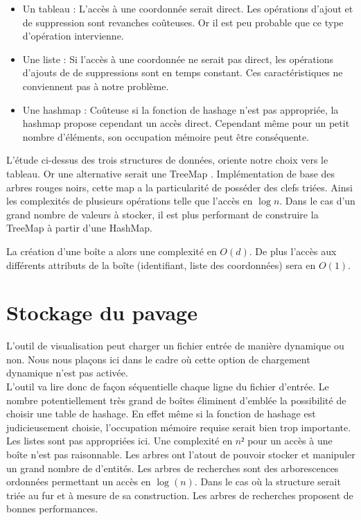 \begin{itemize}
 \item
Un tableau : L'accès à une coordonnée serait direct. Les opérations d'ajout et de suppression sont revanches coûteuses. Or il est peu probable que ce type d'opération intervienne.
\item
Une liste : Si l'accès à une coordonnée ne serait pas direct, les opérations d'ajouts de de suppressions sont en temps constant. Ces caractéristiques ne conviennent pas à notre problème.
\item
Une hashmap : Coûteuse si la fonction de hashage n'est pas appropriée, la hashmap propose cependant un accès direct. Cependant même pour un petit nombre d'éléments, son occupation mémoire peut être conséquente. 
\end{itemize}
L'étude ci-dessus des trois structures de données, oriente notre choix vers le tableau. Or une alternative serait une TreeMap \cite{Treemap}. 
Implémentation de base des arbres rouges noirs, cette map a la particularité de posséder des clefs triées. Ainsi les complexités de plusieurs opérations telle que l'accès en $\log{n}$. Dans le cas d'un grand nombre de valeurs à stocker, il est plus performant de construire la TreeMap à partir d'une HashMap.

La création d'une boîte a alors une complexité en $O(d)$. De plus l'accès aux différents attributs de la boîte (identifiant, liste des coordonnées) sera en $O(1)$.


\section{Stockage du pavage }
L'outil de visualisation peut charger un fichier entrée de manière dynamique ou non. Nous nous plaçons ici dans le cadre où cette option de chargement dynamique n'est pas activée. \\ L'outil va lire donc de façon séquentielle chaque ligne du fichier d'entrée. %
Le nombre potentiellement très grand de boîtes éliminent d'emblée la possibilité de choisir  une table de hashage. En effet même si la fonction de hashage est judicieusement choisie, l'occupation mémoire requise serait bien trop importante. Les listes sont pas appropriées ici. Une complexité en $n²$ pour un accès à une boîte n'est pas raisonnable. Les arbres ont l'atout de pouvoir stocker et manipuler un grand nombre de d'entités. Les arbres de recherches sont des arborescences ordonnées permettant un accès en $\log(n)$. Dans le cas où la structure serait triée au fur et à mesure de sa construction. Les arbres de recherches proposent de bonnes performances.

